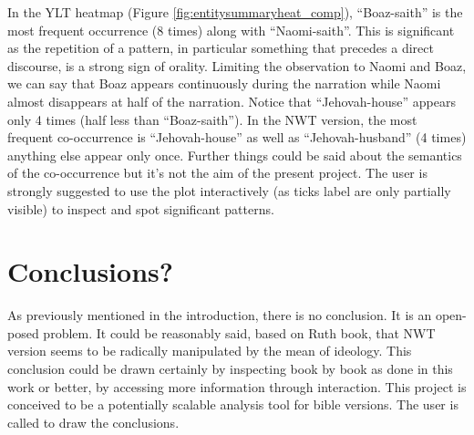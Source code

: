\documentclass[sigchi]{article}
\begin{document}
In the YLT heatmap (Figure \ref{fig:entitysummaryheat_comp}), “Boaz-saith” is the most frequent occurrence (8 times) along with “Naomi-saith”. This is significant as the repetition of a pattern, in particular something that precedes a direct discourse, is a strong sign of orality. Limiting the observation to Naomi and  Boaz, we can say that Boaz appears continuously during the narration while Naomi almost disappears at half of the narration. Notice that “Jehovah-house” appears only 4 times (half less than “Boaz-saith”).
In the NWT version, the most frequent co-occurrence is “Jehovah-house” as well as “Jehovah-husband” (4 times) anything else appear only once. Further things could be said about the semantics of the co-occurrence but it’s not the aim of the present project. The user is strongly suggested to use the plot interactively (as ticks label are only partially visible) to inspect and spot significant patterns.

\section{Conclusions?}
As previously mentioned in the introduction, there is no conclusion. It is an open-posed problem. It could be reasonably said, based on Ruth book, that NWT version seems to be radically manipulated by the mean of ideology. This conclusion could be drawn certainly by inspecting book by book as done in this work or better, by accessing more information through interaction. This project is conceived to be a potentially scalable analysis tool for bible versions. The user is called to draw the conclusions.



\end{document}
